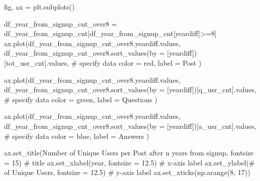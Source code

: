 \documentclass[
  letterpaper,
  DIV=11,
  numbers=noendperiod]{scrartcl}
\newenvironment{Shaded}{\begin{snugshade}}{\end{snugshade}}
\newcommand{\CommentTok}[1]{\textcolor[rgb]{0.37,0.37,0.37}{#1}}
\newcommand{\DecValTok}[1]{\textcolor[rgb]{0.68,0.00,0.00}{#1}}
\newcommand{\FloatTok}[1]{\textcolor[rgb]{0.68,0.00,0.00}{#1}}
\newcommand{\NormalTok}[1]{\textcolor[rgb]{0.00,0.23,0.31}{#1}}
\newcommand{\OperatorTok}[1]{\textcolor[rgb]{0.37,0.37,0.37}{#1}}
\newcommand{\StringTok}[1]{\textcolor[rgb]{0.13,0.47,0.30}{#1}}
\begin{document}
\begin{Shaded}
\begin{Highlighting}[]
\NormalTok{fig, ax }\OperatorTok{=}\NormalTok{ plt.subplots()}


\NormalTok{df\_year\_from\_signup\_cnt\_over8 }\OperatorTok{=}\NormalTok{ df\_year\_from\_signup\_cnt[df\_year\_from\_signup\_cnt[}\StringTok{\textquotesingle{}yeardiff\textquotesingle{}}\NormalTok{]}\OperatorTok{\textgreater{}=}\DecValTok{8}\NormalTok{]}
\NormalTok{ax.plot(df\_year\_from\_signup\_cnt\_over8.yeardiff.values, }
\NormalTok{        df\_year\_from\_signup\_cnt\_over8.sort\_values(by }\OperatorTok{=}\NormalTok{ [}\StringTok{\textquotesingle{}yeardiff\textquotesingle{}}\NormalTok{])[}\StringTok{\textquotesingle{}tot\_usr\_cnt\textquotesingle{}}\NormalTok{].values, }\CommentTok{\# specify data}
\NormalTok{        color }\OperatorTok{=} \StringTok{\textquotesingle{}red\textquotesingle{}}\NormalTok{,}
\NormalTok{        label }\OperatorTok{=} \StringTok{\textquotesingle{}Post\textquotesingle{}}
\NormalTok{) }


\NormalTok{ax.plot(df\_year\_from\_signup\_cnt\_over8.yeardiff.values,}
\NormalTok{        df\_year\_from\_signup\_cnt\_over8.sort\_values(by }\OperatorTok{=}\NormalTok{ [}\StringTok{\textquotesingle{}yeardiff\textquotesingle{}}\NormalTok{])[}\StringTok{\textquotesingle{}q\_usr\_cnt\textquotesingle{}}\NormalTok{].values, }\CommentTok{\# specify data}
\NormalTok{        color }\OperatorTok{=} \StringTok{\textquotesingle{}green\textquotesingle{}}\NormalTok{,}
\NormalTok{        label }\OperatorTok{=} \StringTok{\textquotesingle{}Questions\textquotesingle{}}
\NormalTok{) }

\NormalTok{ax.plot(df\_year\_from\_signup\_cnt\_over8.yeardiff.values,}
\NormalTok{        df\_year\_from\_signup\_cnt\_over8.sort\_values(by }\OperatorTok{=}\NormalTok{ [}\StringTok{\textquotesingle{}yeardiff\textquotesingle{}}\NormalTok{])[}\StringTok{\textquotesingle{}a\_usr\_cnt\textquotesingle{}}\NormalTok{].values, }\CommentTok{\# specify data}
\NormalTok{        color }\OperatorTok{=} \StringTok{\textquotesingle{}blue\textquotesingle{}}\NormalTok{,}
\NormalTok{        label }\OperatorTok{=} \StringTok{\textquotesingle{}Answers\textquotesingle{}}
\NormalTok{) }



\NormalTok{ax.set\_title(}\StringTok{\textquotesingle{}Number of Unique Users per Post after n years from signup\textquotesingle{}}\NormalTok{, fontsize }\OperatorTok{=} \DecValTok{15}\NormalTok{) }\CommentTok{\# title}
\NormalTok{ax.set\_xlabel(}\StringTok{\textquotesingle{}year\textquotesingle{}}\NormalTok{, fontsize }\OperatorTok{=} \FloatTok{12.5}\NormalTok{) }\CommentTok{\# x{-}axis label}
\NormalTok{ax.set\_ylabel(}\StringTok{\textquotesingle{}\# of Unique Users\textquotesingle{}}\NormalTok{, fontsize }\OperatorTok{=} \FloatTok{12.5}\NormalTok{) }\CommentTok{\# y{-}axis label}
\NormalTok{ax.set\_xticks(np.arange(}\DecValTok{8}\NormalTok{, }\DecValTok{17}\NormalTok{))}


\end{Highlighting}
\end{Shaded}
\end{document}
